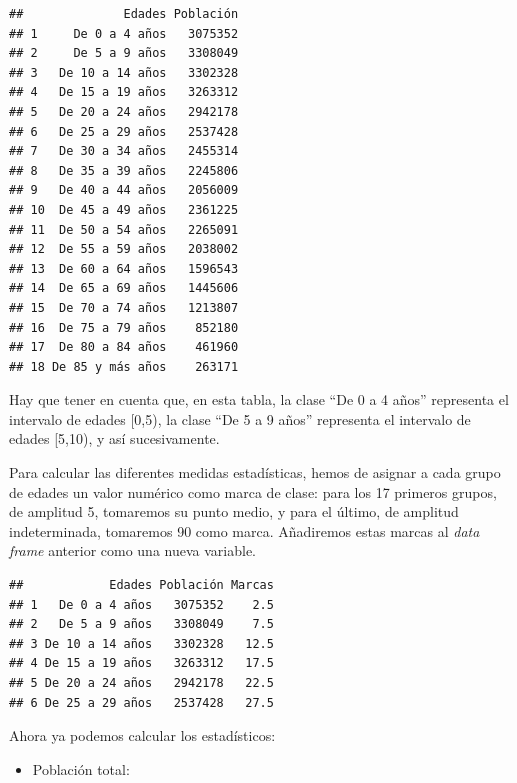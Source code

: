 \documentclass[]{book}
\newenvironment{Shaded}{\begin{snugshade}}{\end{snugshade}}
\newcommand{\DecValTok}[1]{\textcolor[rgb]{0.00,0.00,0.81}{#1}}
\newcommand{\FloatTok}[1]{\textcolor[rgb]{0.00,0.00,0.81}{#1}}
\newcommand{\KeywordTok}[1]{\textcolor[rgb]{0.13,0.29,0.53}{\textbf{#1}}}
\newcommand{\NormalTok}[1]{#1}
\newcommand{\OperatorTok}[1]{\textcolor[rgb]{0.81,0.36,0.00}{\textbf{#1}}}
\providecommand{\tightlist}{%
  \setlength{\itemsep}{0pt}\setlength{\parskip}{0pt}}
\theoremstyle{definition}
\theoremstyle{definition}
\theoremstyle{definition}
\theoremstyle{remark}
\begin{document}
\begin{verbatim}
##              Edades Población
## 1     De 0 a 4 años   3075352
## 2     De 5 a 9 años   3308049
## 3   De 10 a 14 años   3302328
## 4   De 15 a 19 años   3263312
## 5   De 20 a 24 años   2942178
## 6   De 25 a 29 años   2537428
## 7   De 30 a 34 años   2455314
## 8   De 35 a 39 años   2245806
## 9   De 40 a 44 años   2056009
## 10  De 45 a 49 años   2361225
## 11  De 50 a 54 años   2265091
## 12  De 55 a 59 años   2038002
## 13  De 60 a 64 años   1596543
## 14  De 65 a 69 años   1445606
## 15  De 70 a 74 años   1213807
## 16  De 75 a 79 años    852180
## 17  De 80 a 84 años    461960
## 18 De 85 y más años    263171
\end{verbatim}

Hay que tener en cuenta que, en esta tabla, la clase ``De 0 a 4 años'' representa el intervalo de edades {[}0,5), la clase ``De 5 a 9 años'' representa el intervalo de edades {[}5,10), y así sucesivamente.

Para calcular las diferentes medidas estadísticas, hemos de asignar a cada grupo de edades un valor numérico como marca de clase: para los 17 primeros grupos, de amplitud 5, tomaremos su punto medio, y para el último, de amplitud indeterminada, tomaremos 90 como marca. Añadiremos estas marcas al \emph{data frame} anterior como una nueva variable.

\begin{Shaded}
\end{Shaded}

\begin{verbatim}
##            Edades Población Marcas
## 1   De 0 a 4 años   3075352    2.5
## 2   De 5 a 9 años   3308049    7.5
## 3 De 10 a 14 años   3302328   12.5
## 4 De 15 a 19 años   3263312   17.5
## 5 De 20 a 24 años   2942178   22.5
## 6 De 25 a 29 años   2537428   27.5
\end{verbatim}

Ahora ya podemos calcular los estadísticos:

\begin{itemize}
\tightlist
\item
  Población total:
\end{itemize}
\end{document}
